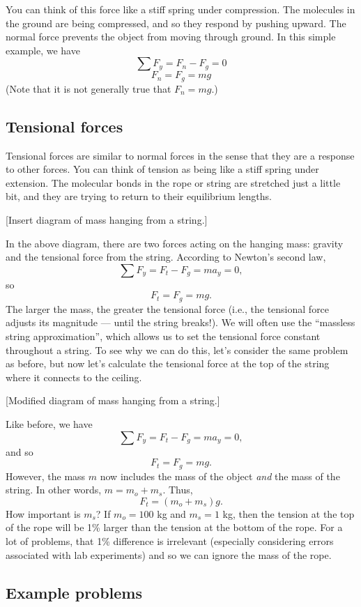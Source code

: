 \vspace{3cm}

You can think of this force like a stiff spring under compression. The molecules in the ground are being compressed, and so they respond by pushing upward. The normal force prevents the object from moving through ground. In this simple example, we have
$$\sum F_y=F_n-F_g=0$$
$$F_n=F_g=mg$$
(Note that it is not generally true that $F_n=mg$.)

\subsection{Tensional forces}
Tensional forces are similar to normal forces in the sense that they are a response to other forces. You can think of tension as being like a stiff spring under extension. The molecular bonds in the rope or string are stretched just a little bit, and they are trying to return to their equilibrium lengths.

[Insert diagram of mass hanging from a string.]
\vspace{3cm}

In the above diagram, there are two forces acting on the hanging mass: gravity and the tensional force from the string. According to Newton's second law, 
$$\sum F_y=F_t-F_g=ma_y=0,$$
so
$$F_t=F_g=mg.$$
The larger the mass, the greater the tensional force (i.e., the tensional force adjusts its magnitude --- until the string breaks!). We will often use the ``massless string approximation'', which allows us to set the tensional force constant throughout a string. To see why we can do this, let's consider 
the same problem as before, but now let's calculate the tensional force at the top of the string where it connects to the ceiling.

[Modified diagram of mass hanging from a string.]

\clearpage
Like before, we have
$$\sum F_y=F_t-F_g=ma_y=0,$$
and so
$$F_t=F_g=mg.$$
However, the mass $m$ now includes the mass of the object \textit{and} the mass of the string. In other words, $m=m_o+m_s$. Thus,
$$F_t=(m_o+m_s)g.$$
How important is $m_s$? If $m_o=100$ kg and $m_s=1$ kg, then the tension at the top of the rope will be 1\% larger than the tension at the bottom of the rope. For a lot of problems, that 1\% difference is irrelevant (especially considering errors associated with lab experiments) and so we can ignore the mass of the rope.

\subsection{Example problems}
